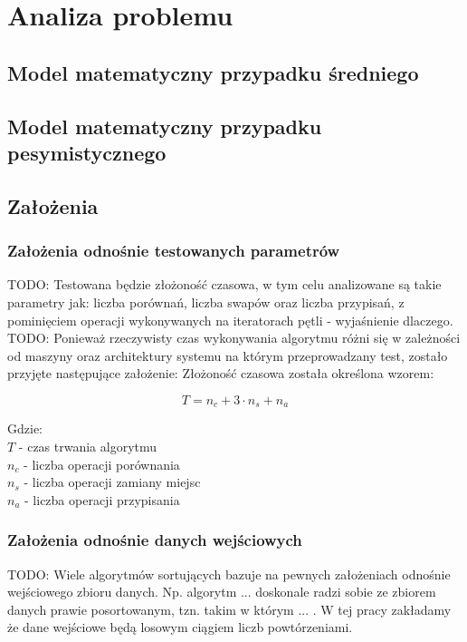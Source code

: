 \chapter{Analiza problemu}

\section{Model matematyczny przypadku średniego}

\section{Model matematyczny przypadku pesymistycznego}

\section{Założenia}

\subsection{Założenia odnośnie testowanych parametrów}
TODO: Testowana będzie złożoność czasowa, w tym celu analizowane są takie parametry jak: liczba porównań,
liczba swapów oraz liczba przypisań, z pominięciem operacji wykonywanych na iteratorach pętli -
wyjaśnienie dlaczego.\\

TODO: Ponieważ rzeczywisty czas wykonywania algorytmu różni się w zależności od maszyny oraz architektury systemu
na którym przeprowadzany test, zostało przyjęte następujące założenie:
Złożoność czasowa została określona wzorem:

\boldmath$$T = n_c + 3 \cdot n_s + n_a $$

Gdzie:\\
\boldmath$T$ - czas trwania algorytmu\\
$n_c$ - liczba operacji porównania\\
$n_s$ - liczba operacji zamiany miejsc\\
$n_a$ - liczba operacji przypisania\\

\subsection{Założenia odnośnie danych wejściowych}
TODO: Wiele algorytmów sortujących bazuje na pewnych założeniach odnośnie wejściowego zbioru danych.
Np. algorytm ... doskonale radzi sobie ze zbiorem danych prawie posortowanym, tzn.
takim w którym ... . W tej pracy zakładamy że dane wejściowe będą losowym ciągiem liczb powtórzeniami.
